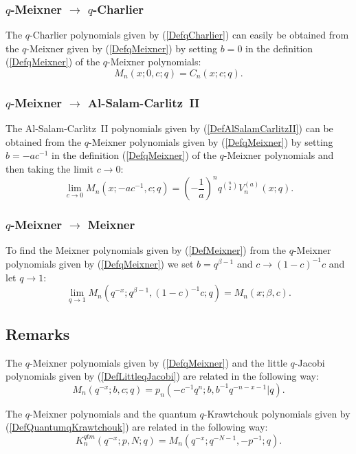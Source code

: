 \documentclass[envcountchap,graybox]{svmono}
\newcounter{rom}
\begin{document}
\subsubsection*{$q$-Meixner $\rightarrow$ $q$-Charlier}
The $q$-Charlier polynomials given by (\ref{DefqCharlier}) can easily be
obtained from the $q$-Meixner given by (\ref{DefqMeixner}) by setting $b=0$
in the definition (\ref{DefqMeixner}) of the $q$-Meixner polynomials:
\begin{equation}
M_n(x;0,c;q)=C_n(x;c;q).
\end{equation}

\subsubsection*{$q$-Meixner $\rightarrow$ Al-Salam-Carlitz~II}
The Al-Salam-Carlitz~II polynomials given by (\ref{DefAlSalamCarlitzII})
can be obtained from the $q$-Meixner polynomials given by (\ref{DefqMeixner})
by setting $b=-ac^{-1}$ in the definition (\ref{DefqMeixner}) of the
$q$-Meixner polynomials and then taking the limit $c\rightarrow 0$:
\begin{equation}
\lim_{c\rightarrow 0}M_n(x;-ac^{-1},c;q)=
\left(-\frac{1}{a}\right)^nq^{\binom{n}{2}}V_n^{(a)}(x;q).
\end{equation}

\subsubsection*{$q$-Meixner $\rightarrow$ Meixner}
To find the Meixner polynomials given by (\ref{DefMeixner}) from the $q$-Meixner polynomials given by
(\ref{DefqMeixner}) we set $b=q^{\beta-1}$ and $c\rightarrow (1-c)^{-1}c$ and let $q\rightarrow 1$:
\begin{equation}
\lim_{q\rightarrow 1}M_n(q^{-x};q^{\beta-1},(1-c)^{-1}c;q)=M_n(x;\beta,c).
\end{equation}

\subsection*{Remarks}
The $q$-Meixner polynomials given by (\ref{DefqMeixner}) and the little
$q$-Jacobi polynomials given by (\ref{DefLittleqJacobi}) are related in the
following way:
$$M_n(q^{-x};b,c;q)=p_n(-c^{-1}q^n;b,b^{-1}q^{-n-x-1}|q).$$

\noindent
The $q$-Meixner polynomials and the quantum $q$-Krawtchouk polynomials
given by (\ref{DefQuantumqKrawtchouk}) are related in the following way:
$$K_n^{qtm}(q^{-x};p,N;q)=M_n(q^{-x};q^{-N-1},-p^{-1};q).$$
\end{document}

